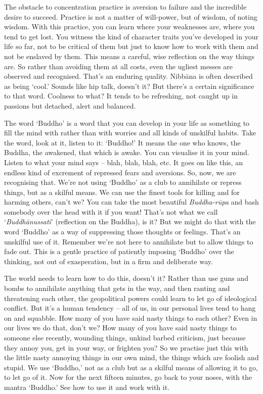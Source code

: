 The obstacle to concentration practice is aversion to failure and the incredible desire to succeed. Practice is not a matter of will-power, but of wisdom, of noting wisdom. With this practice, you can learn where your weaknesses are, where you tend to get lost. You witness the kind of character traits you've developed in your life so far, not to be critical of them but just to know how to work with them and not be enslaved by them. This means a careful, wise reflection on the way things are. So rather than avoiding them at all costs, even the ugliest messes are observed and recognised. That's an enduring quality. Nibbāna is often described as being `cool.' Sounds like hip talk, doesn't it? But there's a certain significance to that word. Coolness to what? It tends to be refreshing, not caught up in passions but detached, alert and balanced.

The word `Buddho' is a word that you can develop in your life as something to fill the mind with rather than with worries and all kinds of unskilful habits. Take the word, look at it, listen to it: `Buddho!' It means the one who knows, the Buddha, the awakened, that which is awake. You can visualise it in your mind. Listen to what your mind says -- blah, blah, blah, etc. It goes on like this, an endless kind of excrement of repressed fears and aversions. So, now, we are recognising that. We're not using `Buddho' as a club to annihilate or repress things, but as a skilful means. We can use the finest tools for killing and for harming others, can't we? You can take the most beautiful \textit{Buddha-rūpa} and bash somebody over the head with it if you want! That's not what we call `\textit{Buddhānussati}' (reflection on the Buddha), is it? But we might do that with the word `Buddho' as a way of suppressing those thoughts or feelings. That's an unskilful use of it. Remember we're not here to annihilate but to allow things to fade out. This is a gentle practice of patiently imposing `Buddho' over the thinking, not out of exasperation, but in a firm and deliberate way.

The world needs to learn how to do this, doesn't it? Rather than use guns and bombs to annihilate anything that gets in the way, and then ranting and threatening each other, the geopolitical powers could learn to let go of ideological conflict. But it's a human tendency – all of us, in our personal lives tend to hang on and squabble. How many of you have said nasty things to each other? Even in our lives we do that, don't we? How many of you have said nasty things to someone else recently, wounding things, unkind barbed criticism, just because they annoy you, get in your way, or frighten you? So we practise just this with the little nasty annoying things in our own mind, the things which are foolish and stupid. We use `Buddho,' not as a club but as a skilful means of allowing it to go, to let go of it. Now for the next fifteen minutes, go back to your noses, with the mantra `Buddho.' See how to use it and work with it.

